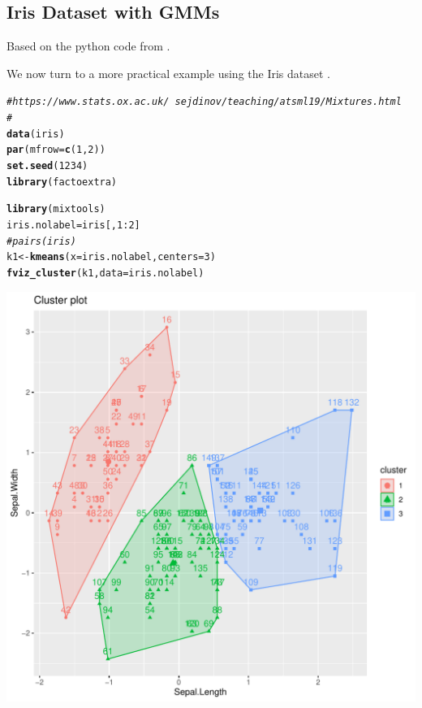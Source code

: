 \documentclass{article}\usepackage[]{graphicx}\usepackage[]{xcolor}
\makeatletter
\def\maxwidth{ %
  \ifdim\Gin@nat@width>\linewidth
    \linewidth
  \else
    \Gin@nat@width
  \fi
}
\newcommand{\hlnum}[1]{\textcolor[rgb]{0.686,0.059,0.569}{#1}}%
\newcommand{\hlcom}[1]{\textcolor[rgb]{0.678,0.584,0.686}{\textit{#1}}}%
\newcommand{\hlopt}[1]{\textcolor[rgb]{0,0,0}{#1}}%
\newcommand{\hlstd}[1]{\textcolor[rgb]{0.345,0.345,0.345}{#1}}%
\newcommand{\hlkwb}[1]{\textcolor[rgb]{0.69,0.353,0.396}{#1}}%
\newcommand{\hlkwc}[1]{\textcolor[rgb]{0.333,0.667,0.333}{#1}}%
\newcommand{\hlkwd}[1]{\textcolor[rgb]{0.737,0.353,0.396}{\textbf{#1}}}%
\newenvironment{kframe}{%
 \def\at@end@of@kframe{}%
 \ifinner\ifhmode%
  \def\at@end@of@kframe{\end{minipage}}%
  \begin{minipage}{\columnwidth}%
 \fi\fi%
 \def\FrameCommand##1{\hskip\@totalleftmargin \hskip-\fboxsep
 \colorbox{shadecolor}{##1}\hskip-\fboxsep
     \hskip-\linewidth \hskip-\@totalleftmargin \hskip\columnwidth}%
 \MakeFramed {\advance\hsize-\width
   \@totalleftmargin\z@ \linewidth\hsize
   \@setminipage}}%
 {\par\unskip\endMakeFramed%
 \at@end@of@kframe}
\newenvironment{knitrout}{}{} %
\theoremstyle{plain}
\theoremstyle{definition}
\theoremstyle{remark}
\makeatother
\begin{document}
\subsection{Iris Dataset with GMMs}
Based on the python code from \cite{Iris_Implementation}.

We now turn to a more practical example using the Iris dataset \cite{Dua:2019}.

\singlespacing
\begin{knitrout}
\color{fgcolor}\begin{kframe}
\begin{alltt}
\hlcom{#  https://www.stats.ox.ac.uk/~sejdinov/teaching/atsml19/Mixtures.html}
\hlcom{# }
\hlkwd{data}\hlstd{(iris)}
\hlkwd{par}\hlstd{(}\hlkwc{mfrow}\hlstd{=}\hlkwd{c}\hlstd{(}\hlnum{1}\hlstd{,}\hlnum{2}\hlstd{))}
\hlkwd{set.seed}\hlstd{(}\hlnum{1234}\hlstd{)}
\hlkwd{library}\hlstd{(factoextra)}
\end{alltt}


{\ttfamily\noindent\itshape\color{messagecolor}{\#\# Loading required package: ggplot2}}

{\ttfamily\noindent\itshape\color{messagecolor}{\#\# Welcome! Want to learn more? See two factoextra-related books at https://goo.gl/ve3WBa}}\begin{alltt}
\hlkwd{library}\hlstd{(mixtools)}
\hlstd{iris.nolabel} \hlkwb{=} \hlstd{iris[,}\hlnum{1}\hlopt{:}\hlnum{2}\hlstd{]}
\hlcom{# pairs(iris)}
\hlstd{k1} \hlkwb{<-} \hlkwd{kmeans}\hlstd{(}\hlkwc{x}\hlstd{=iris.nolabel,} \hlkwc{centers}\hlstd{=}\hlnum{3}\hlstd{)}
\hlkwd{fviz_cluster}\hlstd{(k1,} \hlkwc{data}\hlstd{=iris.nolabel)}
\end{alltt}
\end{kframe}

{\centering \includegraphics[width=\maxwidth]{figure/myrcode3-1} 

}
\end{knitrout}
\end{document}
